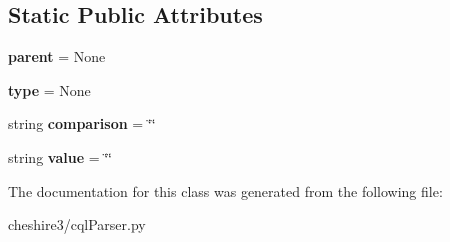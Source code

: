\subsection*{Static Public Attributes}
\begin{DoxyCompactItemize}
\item 
\hypertarget{classcheshire3_1_1cql_parser_1_1_modifier_clause_aaf32d98383195f8d61638c437a8a5828}{{\bfseries parent} = None}\label{classcheshire3_1_1cql_parser_1_1_modifier_clause_aaf32d98383195f8d61638c437a8a5828}

\item 
\hypertarget{classcheshire3_1_1cql_parser_1_1_modifier_clause_aff4a00319724a8eaaf12c5d3b638b9c2}{{\bfseries type} = None}\label{classcheshire3_1_1cql_parser_1_1_modifier_clause_aff4a00319724a8eaaf12c5d3b638b9c2}

\item 
\hypertarget{classcheshire3_1_1cql_parser_1_1_modifier_clause_a0500681c0d6e29293f5c80da447a034e}{string {\bfseries comparison} = \char`\"{}\char`\"{}}\label{classcheshire3_1_1cql_parser_1_1_modifier_clause_a0500681c0d6e29293f5c80da447a034e}

\item 
\hypertarget{classcheshire3_1_1cql_parser_1_1_modifier_clause_a5d78b62bf36ee6f5c7dc6a9b7039c239}{string {\bfseries value} = \char`\"{}\char`\"{}}\label{classcheshire3_1_1cql_parser_1_1_modifier_clause_a5d78b62bf36ee6f5c7dc6a9b7039c239}

\end{DoxyCompactItemize}


The documentation for this class was generated from the following file\-:\begin{DoxyCompactItemize}
\item 
cheshire3/cql\-Parser.\-py\end{DoxyCompactItemize}

